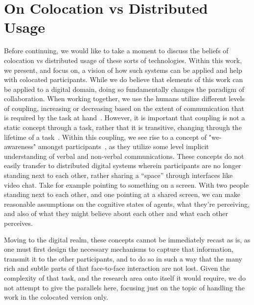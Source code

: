 \section{On Colocation vs Distributed Usage}

Before continuing, we would like to take a moment to discuss the beliefs of
colocation vs distributed usage of these sorts of technologies. Within this
work, we present, and focus on, a vision of how such systems can be applied and
help with colocated participants. While we do believe that elements of this work
can be applied to a digital domain, doing so fundamentally changes the paradigm
of collaboration. When working together, we use the humans utilize different
levels of coupling, increasing or decreasing based on the extent of
communication that is required by the task at
hand~\cite{salvador_denver_1996,olson_distance_2000}. However, it is important
that coupling is not a static concept through a task, rather that it is
transitive, changing through the lifetime of a task~\cite{jakobsen_up_2014}.
Within this coupling, we see rise to a concept of
"we-awareness" amongst participants~\cite{greenberg_implications_2016}, as they
utilize some level implicit understanding of verbal and non-verbal
communications. These concepts do not easily transfer to distributed digital
systems wherein participants are no longer standing next to each other, rather
sharing a ``space'' through interfaces like video chat. Take for example
pointing to something on a screen. With two people standing next to each other,
and one pointing at a shared screen, we can make reasonable assumptions on the
cognitive states of agents, what they're perceiving, and also of what they might
believe about each other and what each other perceives.

Moving to the digital realm, these concepts cannot be
immediately recast as is, as one must first design the necessary mechanisms to
capture that information, transmit it to the other participants, and to do so in
such a way that the many rich and subtle parts of that face-to-face interaction
are not lost. Given the complexity of that task, and the research area onto
itself it would require, we do not attempt to give the parallels here, focusing
just on the topic of handling the work in the colocated version only.
